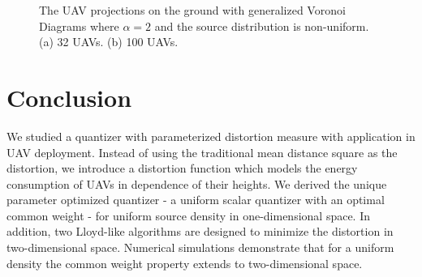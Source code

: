 \documentclass[12pt,onecolumn,journal,draftclsnofoot,letterpaper]{IEEEtran}
\begin{document}
\begin{figure}[t]
\centering
{}
\hfil
{}
\captionsetup{justification=justified}
\vspace{-2ex}
\caption{\small{The UAV projections on the ground with generalized Voronoi Diagrams where $\alpha=2$ and the source distribution is non-uniform. 
(a) 32 UAVs. (b) 100 UAVs.}}
\label{uniformDistortionPartition3}
\end{figure}
\else   \fi
\section{Conclusion}
%
We studied a quantizer with parameterized distortion measure with application in UAV deployment.
Instead of using the traditional mean
distance square as the distortion, we introduce a distortion function which models the energy consumption of UAVs in
dependence of their heights.  We derived the unique parameter optimized quantizer - a uniform scalar quantizer with an
optimal common weight - for uniform source density in one-dimensional space.  In addition, two Lloyd-like algorithms are
designed to minimize the distortion in two-dimensional space.  Numerical simulations demonstrate that for a uniform
density the common weight property extends to two-dimensional space.
\end{document}
